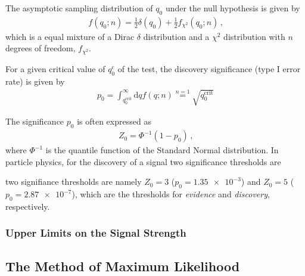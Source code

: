 The asymptotic sampling distribution of $q_0$ under the null hypothesis is given
by
\begin{align*}
  f(q_0; n) = \frac{1}{2} \delta(q_0) + \frac{1}{2} f_{\chi^2}(q_0; n) \,\text{,}
\end{align*}
which is a equal mixture of a Dirac $\delta$ distribution and a $\chi^2$
distribution with $n$ degrees of freedom, $f_{\chi^2}$.

For a given critical value of $q_0^\text{c}$ of the test, the discovery
significance (type I error rate) is given by
\begin{align*}
  p_0 = \int_{q_0^\text{crit}}^\infty \mathrm{d}q f(q; n) \overset{n = 1}{=} \sqrt{q_0^\text{crit}}
\end{align*}

The significance $p_0$ is often expressed as
\begin{align*}
  Z_0 = \Phi^{-1}(1 - p_0) \,\text{,}
\end{align*}
where $\Phi^{-1}$ is the quantile function of the Standard Normal
distribution. In particle physics, for the discovery of a signal two
significance thresholds are


two signifiance thresholds are namely $Z_0 = 3$ ($p_0 = \num{1.35e-3}$) and
$Z_0 = 5$ ($p_0 = \num{2.87e-7}$), which are the thresholds for \emph{evidence}
and \emph{discovery}, respectively.


\subsubsection{Upper Limits on the Signal Strength}



\subsection{The Method of Maximum Likelihood}

